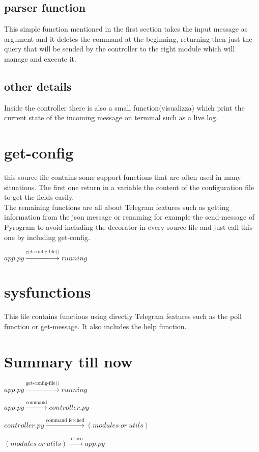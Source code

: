 \documentclass{article}
\begin{document}
\subsection{parser function}
This simple function mentioned in the first section takes the input message as argument and it deletes the command at the beginning, returning then just the query that will be sended by the controller to the right module which will manage and execute it.

\subsection{other details}
Inside the controller there is also a small function(visualizza) which print the current state of the incoming message on terminal such as a live log. \\

\section{get-config}
this source file contains some support functions that are often used in many situations. The first one return in a variable the content of the configuration file to get the fields easily. \\
The remaining functions are all about Telegram features such as getting information from the json message or renaming for example the send-message of Pyrogram to avoid including the decorator in every source file and just call this one by including get-config.
\begin{center} $app.py \xrightarrow{\text{get-config-file()}} running$ \end{center}

\section{sysfunctions}
This file contains functions using directly Telegram features such as the poll function or get-message. It also includes the help function.

\section{Summary till now}
\begin{center} $app.py \xrightarrow{\text{get-config-file()}} running$ \end{center}
\begin{center} $app.py \xrightarrow{\text{command}} controller.py$ \end{center}
\begin{center} $controller.py \xrightarrow{\text{command fetched}} (modules \ or  \ utils)$ \end{center}
\begin{center} $(modules \ or \ utils) \xrightarrow{\text{return}} app.py$ \end{center}
\end{document}
